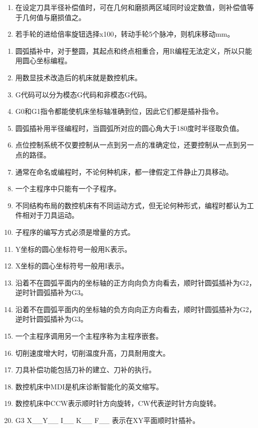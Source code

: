 \documentclass[12pt,twocolumn,landscape,UTF8,twoside]{ctexart}
\begin{document}
\begin{spacing}{1}
\begin{enumerate} [1.]
\item 在设定刀具半径补偿值时，可在几何和磨损两区域同时设定数值，则补偿值等于几何值与磨损值之。

\item 若手轮的进给倍率旋钮选择x100，转动手轮5个脉冲，则机床移动mm。
\end{enumerate}
\begin{enumerate} [1、]
\item 圆弧插补中，对于整圆，其起点和终点相重合，用R编程无法定义，所以只能用圆心坐标编程。
\item 用数显技术改造后的机床就是数控机床。
\item G代码可以分为模态G代码和非模态G代码。
\item G0和G1指令都能使机床坐标轴准确到位，因此它们都是插补指令。
\item 圆弧插补用半径编程时，当圆弧所对应的圆心角大于180度时半径取负值。
\item 点位控制系统不仅要控制从一点到另一点的准确定位，还要控制从一点到另一点的路径。
\item 通常在命名或编程时，不论何种机床，都一律假定工件静止刀具移动。
\item 一个主程序中只能有一个子程序。
\item 不同结构布局的数控机床有不同运动方式，但无论何种形式，编程时都认为工件相对于刀具运动。
\item 子程序的编写方式必须是增量的方式。
\item Y坐标的圆心坐标符号一般用K表示。
\item X坐标的圆心坐标符号一般用I表示。
\item 沿着不在圆弧平面内的坐标轴的正方向向负方向看去，顺时针圆弧插补为G2，逆时针圆弧插补为G3。
\item 沿着不在圆弧平面内的坐标轴的负方向向正方向看去，顺时针圆弧插补为G2，逆时针圆弧插补为G3。
\item 一个主程序调用另一个主程序称为主程序嵌套。
\item 切削速度增大时，切削温度升高，刀具耐用度大。
\item 刀具补偿功能包括刀补的建立、刀补的执行。
\item 数控机床中MDI是机床诊断智能化的英文缩写。
\item 数控机床中CCW表示顺时针方向旋转，CW代表逆时针方向旋转。
\item G3 X\_\_Y\_\_ I\_\_ K\_\_ F\_\_ 表示在XY平面顺时针插补。

\end{enumerate}
\end{spacing}
\end{document}
